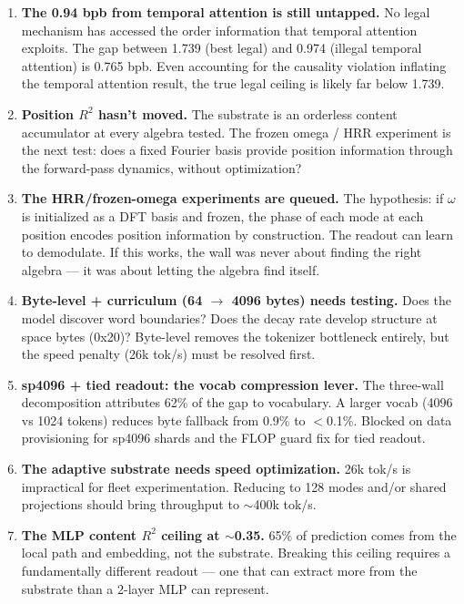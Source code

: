 \documentclass[11pt,a4paper]{report}
\begin{document}
\begin{enumerate}
\item \textbf{The 0.94 bpb from temporal attention is still untapped.} No legal mechanism has accessed the order information that temporal attention exploits. The gap between 1.739 (best legal) and 0.974 (illegal temporal attention) is 0.765 bpb. Even accounting for the causality violation inflating the temporal attention result, the true legal ceiling is likely far below 1.739.

\item \textbf{Position $R^2$ hasn't moved.} The substrate is an orderless content accumulator at every algebra tested. The frozen omega / HRR experiment is the next test: does a fixed Fourier basis provide position information through the forward-pass dynamics, without optimization?

\item \textbf{The HRR/frozen-omega experiments are queued.} The hypothesis: if $\omega$ is initialized as a DFT basis and frozen, the phase of each mode at each position encodes position information by construction. The readout can learn to demodulate. If this works, the wall was never about finding the right algebra --- it was about letting the algebra find itself.

\item \textbf{Byte-level + curriculum (64 $\to$ 4096 bytes) needs testing.} Does the model discover word boundaries? Does the decay rate develop structure at space bytes (0x20)? Byte-level removes the tokenizer bottleneck entirely, but the speed penalty (26k tok/s) must be resolved first.

\item \textbf{sp4096 + tied readout: the vocab compression lever.} The three-wall decomposition \cite{session7} attributes 62\% of the gap to vocabulary. A larger vocab (4096 vs 1024 tokens) reduces byte fallback from 0.9\% to $<$0.1\%. Blocked on data provisioning for sp4096 shards and the FLOP guard fix for tied readout.

\item \textbf{The adaptive substrate needs speed optimization.} 26k tok/s is impractical for fleet experimentation. Reducing to 128 modes and/or shared projections should bring throughput to $\sim$400k tok/s.

\item \textbf{The MLP content $R^2$ ceiling at $\sim$0.35.} 65\% of prediction comes from the local path and embedding, not the substrate. Breaking this ceiling requires a fundamentally different readout --- one that can extract more from the substrate than a 2-layer MLP can represent.
\end{enumerate}
\end{document}
